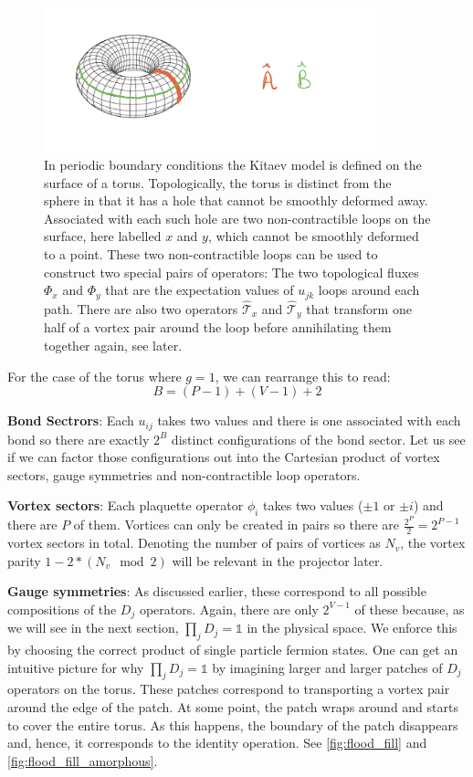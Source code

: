 \begin{figure}
\hypertarget{fig:torus}{%
\centering
\includegraphics[width=0.86\textwidth,height=\textheight]{figure_code/amk_chapter/torus.jpeg}
\caption{In periodic boundary conditions the Kitaev model is defined on the surface of a torus. Topologically, the torus is distinct from the sphere in that it has a hole that cannot be smoothly deformed away. Associated with each such hole are two non-contractible loops on the surface, here labelled \(x\) and \(y\), which cannot be smoothly deformed to a point. These two non-contractible loops can be used to construct two special pairs of operators: The two topological fluxes \(\Phi_x\) and \(\Phi_y\) that are the expectation values of \(u_{jk}\) loops around each path. There are also two operators \(\hat{\mathcal{T}}_x\) and \(\hat{\mathcal{T}}_y\) that transform one half of a vortex pair around the loop before annihilating them together again, see later.}\label{fig:torus}
}
\end{figure}

For the case of the torus where \(g = 1\), we can rearrange this to read: \[B = (P-1) + (V-1) + 2\]

\textbf{Bond Sectrors}: Each \(u_{ij}\) takes two values and there is one associated with each bond so there are exactly \(2^B\) distinct configurations of the bond sector. Let us see if we can factor those configurations out into the Cartesian product of vortex sectors, gauge symmetries and non-contractible loop operators.

\textbf{Vortex sectors}: Each plaquette operator \(\phi_i\) takes two values (\(\pm 1\) or \(\pm i\)) and there are \(P\) of them. Vortices can only be created in pairs so there are \(\tfrac{2^P}{2} = 2^{P-1}\) vortex sectors in total. Denoting the number of pairs of vortices as \(N_v\), the vortex parity \(1 - 2*(N_v \mod 2)\) will be relevant in the projector later.

\textbf{Gauge symmetries}: As discussed earlier, these correspond to all possible compositions of the \(D_j\) operators. Again, there are only \(2^{V-1}\) of these because, as we will see in the next section, \(\prod_{j} D_j = \mathbb{1}\) in the physical space. We enforce this by choosing the correct product of single particle fermion states. One can get an intuitive picture for why \(\prod_{j} D_j = \mathbb{1}\) by imagining larger and larger patches of \(D_j\) operators on the torus. These patches correspond to transporting a vortex pair around the edge of the patch. At some point, the patch wraps around and starts to cover the entire torus. As this happens, the boundary of the patch disappears and, hence, it corresponds to the identity operation. See \cref{fig:flood_fill} and \cref{fig:flood_fill_amorphous}.

